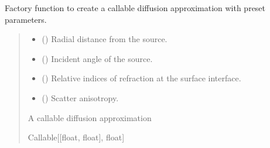 \documentclass[letterpaper,10pt,english]{sphinxmanual}
\begin{document}

\begin{fulllineitems}
\label{\detokenize{generated/photon_canon.contrib.diffusion_theory:photon_canon.contrib.diffusion_theory.create_diffusion_approximation}}
\pysigstartsignatures
\pysiglinewithargsret
{}
{\sphinxparamcomma {}\sphinxparamcomma {}\sphinxparamcomma {}}
{}
\pysigstopsignatures
\sphinxAtStartPar
Factory function to create a callable diffusion approximation with pre\sphinxhyphen{}set parameters.
\begin{quote}\begin{description}
\begin{itemize}
\item {} 
\sphinxAtStartPar
{} () \textendash{} Radial distance from the source.

\item {} 
\sphinxAtStartPar
{} () \textendash{} Incident angle of the source.

\item {} 
\sphinxAtStartPar
{} () \textendash{} Relative indices of refraction at the surface interface.

\item {} 
\sphinxAtStartPar
{} () \textendash{} Scatter anisotropy.

\end{itemize}

\sphinxAtStartPar
A callable diffusion approximation

\sphinxAtStartPar
Callable{[}{[}float, float{]}, float{]}

\end{description}\end{quote}

\end{fulllineitems}
\end{document}
